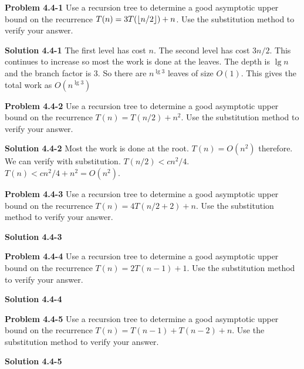 \documentclass{article}
\DeclarePairedDelimiter\floor{\lfloor}{\rfloor}
\begin{document}
\hrulefill

\medskip

\textbf{Problem 4.4-1} Use a recursion tree to determine a good asymptotic upper bound on the recurrence $T(n) = 3T(\floor{n/2}) + n$. Use the substitution method to verify your answer.

\medskip

\textbf{Solution 4.4-1} The first level has cost $n$. The second level has cost $3n/2$. This continues to increase so most the work is done at the leaves. The depth is $\lg n$ and the branch factor is 3. So there are $n^{\lg 3}$ leaves of size $O(1)$. This gives the total work as $O(n^{\lg 3})$

\hrulefill

\medskip

\textbf{Problem 4.4-2} Use a recursion tree to determine a good asymptotic upper bound on the recurrence $T(n) = T(n/2) + n^2$. Use the substitution method to verify your answer.

\medskip

\textbf{Solution 4.4-2} Most the work is done at the root. $T(n) = O(n^2)$ therefore. We can verify with substitution. $T(n/2) < cn^2/4$. $T(n) < cn^2/4 + n^2 = O(n^2)$.

\hrulefill

\medskip

\textbf{Problem 4.4-3} Use a recursion tree to determine a good asymptotic upper bound on the recurrence $T(n) = 4T(n/2 + 2) + n$. Use the substitution method to verify your answer.

\medskip

\textbf{Solution 4.4-3}

\hrulefill

\medskip

\textbf{Problem 4.4-4} Use a recursion tree to determine a good asymptotic upper bound on the recurrence $T(n) = 2T(n-1) + 1$. Use the substitution method to verify your answer.

\medskip

\textbf{Solution 4.4-4}

\hrulefill

\medskip

\textbf{Problem 4.4-5} Use a recursion tree to determine a good asymptotic upper bound on the recurrence $T(n) = T(n-1) + T(n-2) + n$. Use the substitution method to verify your answer.

\medskip

\textbf{Solution 4.4-5}
\end{document}
